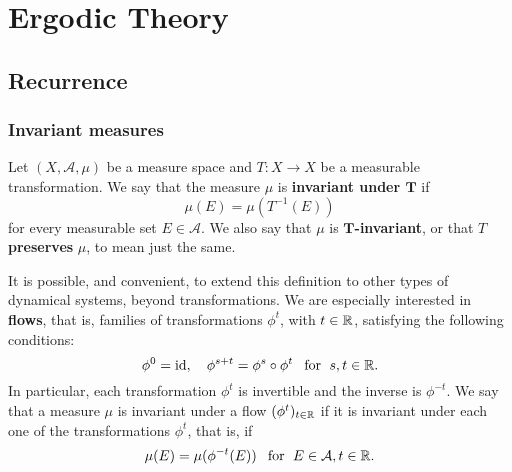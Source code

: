 \chapter{Ergodic Theory}
\section{Recurrence}
\subsection{Invariant measures}
Let $(X,\mathcal{A},\mu)$ be a measure space and $T:X\to X$ be a measurable transformation. We say that the measure $\mu$ is \textbf{invariant under $\bm{T}$} if
\[\mu(E)=\mu(T^{-1}(E))\]
for every measurable set $E\in\mathcal{A}$. We also say that $\mu$ is \textbf{$\bm{T}$-invariant}, or that $T$ \textbf{preserves} $\mu$, to mean just the same.\par
It is possible, and convenient, to extend this definition to other types of dynamical systems, beyond transformations. We are especially interested in \textbf{flows}, that is, families of transformations $\phi^t$, with $t\in\mathbb{R}$, satisfying the following conditions:
\[\phi^0=\mathrm{id},\quad \phi^{s+t}=\phi^s\circ\phi^t\hspace{8pt}\text{for}\hspace{6pt} s,t\in\mathbb{R}.\]
In particular, each transformation $\phi^t$ is invertible and the inverse is $\phi^{-t}$. We say that a measure $\mu$ is invariant under a flow $(\phi^t)_{t\in\mathbb{R}}$ if it is invariant under each one of the transformations $\phi^t$, that is, if
\[\mu(E)=\mu(\phi^{-t}(E))\hspace{8pt}\text{for}\hspace{6pt} E\in\mathcal{A},t\in\mathbb{R}.\]

